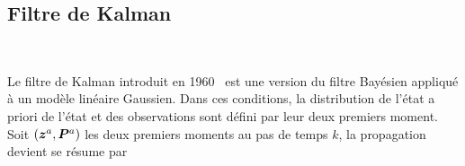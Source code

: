 






\subsection{Filtre de Kalman}~\label{kalman_filter}

Le filtre de Kalman introduit en 1960~\cite{kalman_new_1960} est une version du filtre Bayésien appliqué à un modèle linéaire Gaussien. Dans ces conditions, la distribution de l'état a priori de l'état et des observations sont défini par leur deux premiers moment. Soit $(\bm z^a,\bm  P^a)$ les deux premiers moments au pas de temps $k$, la propagation devient se résume par

